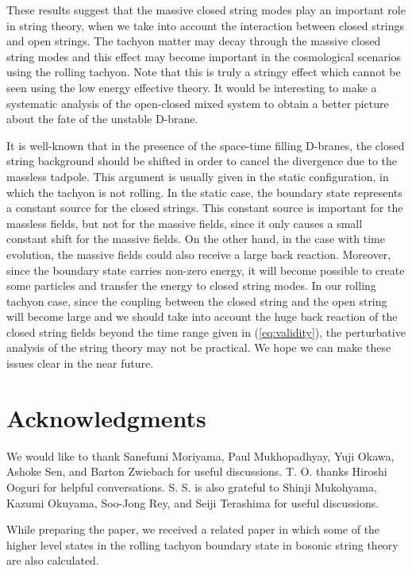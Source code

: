 \documentclass[a4paper,12pt]{article} \textheight=8.5truein
\begin{document}
These results suggest that the massive closed string modes play an
important role in string theory, when we take into account the
interaction between closed strings and open strings. The tachyon
matter may decay through the massive closed string modes and this
effect may become important in the cosmological scenarios using
the rolling tachyon. Note that this is truly a stringy effect
which cannot be seen using the low energy effective theory. It
would be interesting to make a systematic analysis of the
open-closed mixed system to obtain a better picture about the fate
of the unstable D-brane.

It is well-known that in the presence of the space-time filling
D-branes, the closed string background should be shifted in order
to cancel the divergence due to the massless tadpole. This
argument is usually given in the static configuration, in which
the tachyon is not rolling. In the static case, the boundary state
represents a constant source for the closed strings. This constant
source is important for the massless fields, but not for the
massive fields, since it only causes a small constant shift for
the massive fields. On the other hand, in the case with time
evolution, the massive fields could also receive a large back
reaction. Moreover, since the boundary state carries non-zero
energy, it will become possible to create some particles and
transfer the energy to closed string modes. In our rolling tachyon
case, since the coupling between the closed string and the open
string will become large and we should take into account the huge
back reaction of the closed string fields beyond the time range
given in (\ref{eq:validity}), the perturbative analysis of the
string theory may not be practical. We hope we can make these
issues clear in the near future.
\section*{Acknowledgments}
We would like to thank Sanefumi Moriyama, Paul Mukhopadhyay, Yuji
Okawa, Ashoke Sen, and Barton Zwiebach for useful discussions. T.
O. thanks Hiroshi Ooguri for helpful conversations. S. S. is also
grateful to Shinji Mukohyama, Kazumi Okuyama, Soo-Jong Rey, and
Seiji Terashima for useful discussions.


\vspace{3ex}  While preparing the
paper, we received a related paper \cite{Mukhopadhyay:2002en} in
which some of the higher level states in the rolling tachyon
boundary state in bosonic string theory are also calculated.
\end{document}
